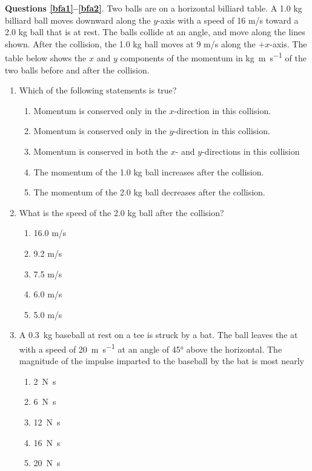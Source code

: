 \documentclass{../../../oss-apphys}
\begin{document}
\begin{multicols}{2}
  \textbf{Questions \ref{bfa1}--\ref{bfa2}}. Two balls are on a horizontal
  billiard table. A 1.0 kg billiard ball moves downward along the $y$-axis with
  a speed of 16 m/s toward a 2.0 kg ball that is at rest. The balls collide at
  an angle, and move along the lines shown. After the collision, the 1.0 kg
  ball moves at 9 m/s along the $+x$-axis. The table below shows the $x$ and
  $y$ components of the momentum in \si{\kilo\gram\metre\per\second} of the two
  balls before and after the collision.
  \begin{enumerate}[leftmargin=18pt,resume]
  \item Which of the following statements is true?
    \label{bfa1}
    \begin{enumerate}[nosep,leftmargin=18pt,label=(\Alph*)]    
    \item Momentum is conserved only in the $x$-direction in this collision.
    \item Momentum is conserved only in the $y$-direction in this collision.
    \item Momentum is conserved in both the $x$- and $y$-directions in this
      collision
    \item The momentum of the 1.0 kg ball increases after the collision.
    \item The momentum of the 2.0 kg ball decreases after the collision.
    \end{enumerate}
    
  \item What is the speed of the 2.0 kg ball after the collision?
    \label{bfa2}
    \begin{enumerate}[nosep,leftmargin=18pt,label=(\Alph*)]
    \item 16.0 m/s
    \item 9.2 m/s
    \item 7.5 m/s
    \item 6.0 m/s
    \item 5.0 m/s
    \end{enumerate}
    \columnbreak
    
  \item A \SI{.3}{\kilo\gram} baseball at rest on a tee is struck by a bat. The
    ball leaves the at with a speed of \SI{20}{\metre\per\second} at an angle
    of \ang{45} above the horizontal. The magnitude of the impulse imparted to
    the baseball by the bat is most nearly
    \begin{enumerate}[nosep,leftmargin=18pt,label=(\Alph*)]
    \item\SI{2}{\newton\second}
    \item\SI{6}{\newton\second}
    \item\SI{12}{\newton\second}
    \item\SI{16}{\newton\second}
    \item\SI{20}{\newton\second}
    \end{enumerate}
    

\end{enumerate}
\end{multicols}
\end{document}
